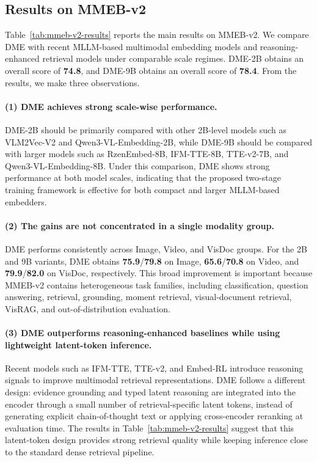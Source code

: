 \subsection{Results on MMEB-v2}
\label{sec:mmeb-v2-results}

Table~\ref{tab:mmeb-v2-results} reports the main results on MMEB-v2. We compare DME with recent MLLM-based multimodal embedding models and reasoning-enhanced retrieval models under comparable scale regimes. DME-2B obtains an overall score of \textbf{74.8}, and DME-9B obtains an overall score of \textbf{78.4}. From the results, we make three observations.

\paragraph{(1) DME achieves strong scale-wise performance.}
DME-2B should be primarily compared with other 2B-level models such as VLM2Vec-V2 and Qwen3-VL-Embedding-2B, while DME-9B should be compared with larger models such as RzenEmbed-8B, IFM-TTE-8B, TTE-v2-7B, and Qwen3-VL-Embedding-8B. Under this comparison, DME shows strong performance at both model scales, indicating that the proposed two-stage training framework is effective for both compact and larger MLLM-based embedders.

\paragraph{(2) The gains are not concentrated in a single modality group.}
DME performs consistently across Image, Video, and VisDoc groups. For the 2B and 9B variants, DME obtains \textbf{75.9}/\textbf{79.8} on Image, \textbf{65.6}/\textbf{70.8} on Video, and \textbf{79.9}/\textbf{82.0} on VisDoc, respectively. This broad improvement is important because MMEB-v2 contains heterogeneous task families, including classification, question answering, retrieval, grounding, moment retrieval, visual-document retrieval, VisRAG, and out-of-distribution evaluation.

\paragraph{(3) DME outperforms reasoning-enhanced baselines while using lightweight latent-token inference.}
Recent models such as IFM-TTE, TTE-v2, and Embed-RL introduce reasoning signals to improve multimodal retrieval representations. DME follows a different design: evidence grounding and typed latent reasoning are integrated into the encoder through a small number of retrieval-specific latent tokens, instead of generating explicit chain-of-thought text or applying cross-encoder reranking at evaluation time. The results in Table~\ref{tab:mmeb-v2-results} suggest that this latent-token design provides strong retrieval quality while keeping inference close to the standard dense retrieval pipeline.

